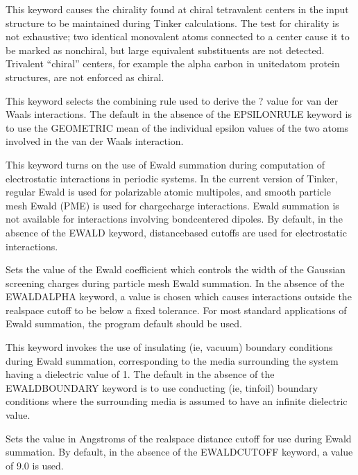 \documentclass[letterpaper,11pt,english]{sphinxmanual}
\begin{document}
  This keyword causes the chirality found at chiral tetravalent centers in the input structure to be maintained during Tinker calculations. The test for chirality is not exhaustive; two identical monovalent atoms connected to a center cause it to be marked as non\sphinxhyphen{}chiral, but large equivalent substituents are not detected. Trivalent “chiral” centers, for example the alpha carbon in united\sphinxhyphen{}atom protein structures, are not enforced as chiral.

  This keyword selects the combining rule used to derive the ? value for van der Waals interactions. The default in the absence of the EPSILONRULE keyword is to use the GEOMETRIC mean of the individual epsilon values of the two atoms involved in the van der Waals interaction.

  This keyword turns on the use of Ewald summation during computation of electrostatic interactions in periodic systems. In the current version of Tinker, regular Ewald is used for polarizable atomic multipoles, and smooth particle mesh Ewald (PME) is used for charge\sphinxhyphen{}charge interactions. Ewald summation is not available for interactions involving bond\sphinxhyphen{}centered dipoles. By default, in the absence of the EWALD keyword, distance\sphinxhyphen{}based cutoffs are used for electrostatic interactions.

  Sets the value of the Ewald coefficient which controls the width of the Gaussian screening charges during particle mesh Ewald summation. In the absence of the EWALD\sphinxhyphen{}ALPHA keyword, a value is chosen which causes interactions outside the real\sphinxhyphen{}space cutoff to be below a fixed tolerance. For most standard applications of Ewald summation, the program default should be used.

  This keyword invokes the use of insulating (ie, vacuum) boundary conditions during Ewald summation, corresponding to the media surrounding the system having a dielectric value of 1. The default in the absence of the EWALD\sphinxhyphen{}BOUNDARY keyword is to use conducting (ie, tinfoil) boundary conditions where the surrounding media is assumed to have an infinite dielectric value.

  Sets the value in Angstroms of the real\sphinxhyphen{}space distance cutoff for use during Ewald summation. By default, in the absence of the EWALD\sphinxhyphen{}CUTOFF keyword, a value of 9.0 is used.
\end{document}

